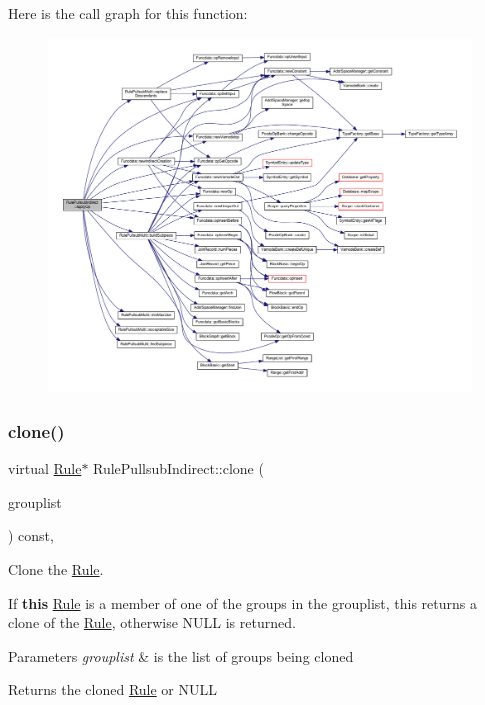 Here is the call graph for this function\+:
\nopagebreak
\begin{figure}[H]
\begin{center}
\leavevmode
\includegraphics[width=350pt]{class_rule_pullsub_indirect_ae8c0c6b22bd0890c5b9ef806ceb91e58_cgraph}
\end{center}
\end{figure}
\mbox{\label{class_rule_pullsub_indirect_a6ad44519f0a5f0bd74d31aed1facae02}} 
\subsubsection{\texorpdfstring{clone()}{clone()}}
{\footnotesize\ttfamily virtual \mbox{\hyperlink{class_rule}{Rule}}$\ast$ Rule\+Pullsub\+Indirect\+::clone (\begin{DoxyParamCaption}\item[{const \mbox{\hyperlink{class_action_group_list}{Action\+Group\+List}} \&}]{grouplist }\end{DoxyParamCaption}) const\hspace{0.3cm}{\ttfamily [inline]}, {\ttfamily [virtual]}}



Clone the \mbox{\hyperlink{class_rule}{Rule}}. 

If {\bfseries{this}} \mbox{\hyperlink{class_rule}{Rule}} is a member of one of the groups in the grouplist, this returns a clone of the \mbox{\hyperlink{class_rule}{Rule}}, otherwise N\+U\+LL is returned. 
\begin{DoxyParams}{Parameters}
{\em grouplist} & is the list of groups being cloned \\
\hline
\end{DoxyParams}
\begin{DoxyReturn}{Returns}
the cloned \mbox{\hyperlink{class_rule}{Rule}} or N\+U\+LL 
\end{DoxyReturn}


